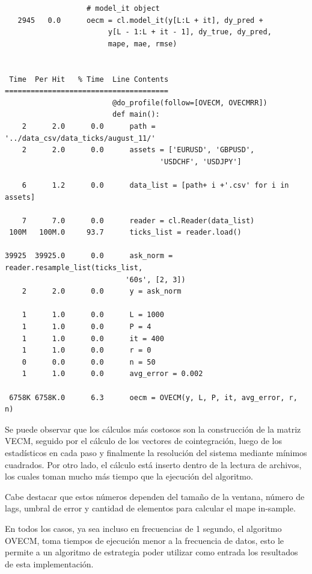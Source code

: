 \begin{verbatim}
                   # model_it object
   2945   0.0      oecm = cl.model_it(y[L:L + it], dy_pred + 
                        y[L - 1:L + it - 1], dy_true, dy_pred, 
                        mape, mae, rmse)


 Time  Per Hit   % Time  Line Contents
======================================
                         @do_profile(follow=[OVECM, OVECMRR])
                         def main():
    2      2.0      0.0      path = '../data_csv/data_ticks/august_11/'
    2      2.0      0.0      assets = ['EURUSD', 'GBPUSD', 
                                    'USDCHF', 'USDJPY']
                             
    6      1.2      0.0      data_list = [path+ i +'.csv' for i in assets]
                             
    7      7.0      0.0      reader = cl.Reader(data_list)
 100M   100M.0     93.7      ticks_list = reader.load()
                         
39925  39925.0      0.0      ask_norm = reader.resample_list(ticks_list, 
                            '60s', [2, 3])            
    2      2.0      0.0      y = ask_norm
                         
    1      1.0      0.0      L = 1000
    1      1.0      0.0      P = 4
    1      1.0      0.0      it = 400
    1      1.0      0.0      r = 0
    0      0.0      0.0      n = 50
    1      1.0      0.0      avg_error = 0.002
                         
 6758K 6758K.0      6.3      oecm = OVECM(y, L, P, it, avg_error, r, n)

\end{verbatim}

Se puede observar que los cálculos más costosos son la construcción de la
matriz VECM, seguido por el cálculo de los vectores de cointegración, luego de
los estadísticos en cada paso y finalmente la resolución del sistema mediante
mínimos cuadrados. Por otro lado, el cálculo está inserto dentro de la lectura
de archivos, los cuales toman mucho más tiempo que la ejecución del algoritmo.

Cabe destacar que estos números dependen del tamaño de la ventana, número de
lags, umbral de error y cantidad de elementos para calcular el mape in-sample.

En todos los casos, ya sea incluso en frecuencias de 1 segundo, el algoritmo
OVECM, toma tiempos de ejecución menor a la frecuencia de datos, esto le
permite a un algoritmo de estrategia poder utilizar como entrada los resultados
de esta implementación.

